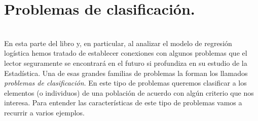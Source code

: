%


\section{Problemas de clasificación.}
\label{cap13:sec:ValorPredictivo}
\\

En esta parte del libro y, en particular, al analizar el modelo de regresión logística  hemos tratado de establecer conexiones con algunos problemas que el lector seguramente se encontrará en el futuro si profundiza en su estudio de la Estadística. Una de esas grandes familias de problemas la forman  los llamados {\em problemas de clasificación}. En este tipo de problemas queremos clasificar a los elementos (o individuos) de una población de acuerdo con algún criterio que nos interesa. Para entender las características de este tipo de problemas vamos a recurrir a varios ejemplos.

